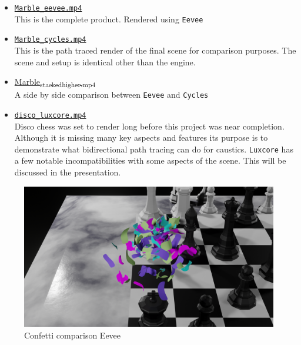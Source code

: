 \documentclass[11pt]{article}
\begin{document}
\begin{itemize}
\item \href{https://github.com/Jake-Moss/blender-chess/blob/master/Videos/Marble\_eevee\_higher.mp4}{\texttt{Marble\_eevee.mp4}}\\
This is the complete product. Rendered using \texttt{Eevee}
\item \href{https://github.com/Jake-Moss/blender-chess/blob/master/Videos/Marble\_cycles\_higher.mp4}{\texttt{Marble\_cycles.mp4}}\\
This is the path traced render of the final scene for comparison purposes. The
scene and setup is identical other than the engine.
\item \href{https://github.com/Jake-Moss/blender-chess/blob/master/Videos/Marble\_stacked\_higher.mp4}{Marble\textsubscript{stacked}\textsubscript{higher.mp4}}\\
A side by side comparison between \texttt{Eevee} and \texttt{Cycles}
\item \href{https://github.com/Jake-Moss/blender-chess/blob/master/Videos/disco\_luxcore.mp4}{\texttt{disco\_luxcore.mp4}}\\
Disco chess was set to render long before this project was near completion.
Although it is missing many key aspects and features its purpose is to
demonstrate what bidirectional path tracing can do for caustics. \texttt{Luxcore} has
a few notable incompatibilities with some aspects of the scene. This will be
discussed in the presentation.
\end{itemize}

\begin{figure}[htbp]
\centering
\includegraphics[width=\textwidth]{Images/confetti-eevee.png}
\caption{\label{confetti-eevee}Confetti comparison Eevee}
\end{figure}
\end{document}
